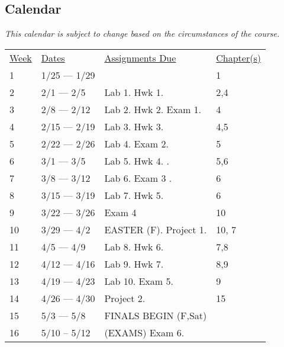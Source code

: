 \documentclass[10pt]{article}
\begin{document}
\subsection{Calendar}

\textit{This calendar is subject to change based on the circumstances of the course.}

\begin{center}
\begin{tabular}{llll}
\underline{Week} & \underline{Dates} & \underline{Assignments Due} & \underline{Chapter(s)}\\
1 & 1/25 --- 1/29  &  &  1\\
2 & 2/1 --- 2/5 & Lab 1. Hwk 1. & 2,4\\
3 & 2/8 --- 2/12 & Lab 2. Hwk 2. Exam 1.  &  4  \\
4 & 2/15 --- 2/19  & Lab 3. Hwk 3. &   4,5 \\
5 & 2/22 --- 2/26 & Lab 4. Exam 2. & 5\\
6 & 3/1 --- 3/5 & Lab 5. Hwk 4. . & 5,6\\
7 & 3/8 --- 3/12 & Lab 6. Exam 3 . &   6 \\
8 & 3/15 --- 3/19 & Lab 7.  Hwk 5. &  6 \\
9 & 3/22 --- 3/26  & Exam 4 & 10  \\
10 & 3/29 --- 4/2  & EASTER (F). Project 1. &  10, 7  \\
11 & 4/5 --- 4/9 &  Lab 8. Hwk 6. &  7,8 \\
12 & 4/12 --- 4/16 &  Lab 9. Hwk 7. & 8,9 \\
13 & 4/19 --- 4/23 & Lab 10. Exam 5.  &  9 \\
14 & 4/26 --- 4/30 &  Project 2. &  15 \\
15 & 5/3 --- 5/8 & FINALS BEGIN (F,Sat)  &  \\
16 & 5/10 -- 5/12 & (EXAMS) Exam 6. &  \\
\end{tabular}
\end{center}
\end{document}
